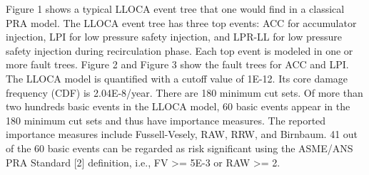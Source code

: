 Figure 1 shows a typical LLOCA event tree that one would find in a classical PRA model. 
The LLOCA event tree has three top events: ACC for accumulator injection, LPI for 
low pressure safety injection, and LPR-LL for low pressure safety injection during 
recirculation phase. Each top event is modeled in one or more fault trees. 
Figure 2 and Figure 3 show the fault trees for ACC and LPI. 
The LLOCA model is quantified with a cutoff value of 1E-12. Its core damage frequency 
(CDF) is 2.04E-8/year. There are 180 minimum cut sets. Of more than two hundreds basic 
events in the LLOCA model, 60 basic events appear in the 180 minimum cut sets and thus 
have importance measures. The reported importance measures include Fussell-Vesely, RAW, 
RRW, and Birnbaum. 41 out of the 60 basic events can be regarded as risk significant using the 
ASME/ANS PRA Standard [2] definition, i.e., FV >= 5E-3 or RAW >= 2. 

